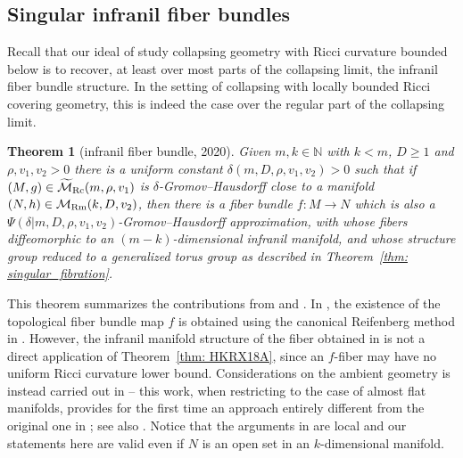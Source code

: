 \documentclass[10pt,a4paper]{amsart}
\numberwithin{equation}{section}
\newtheorem{Theorem}{Theorem}[section]
\begin{document}
\subsection{Singular infranil fiber bundles}\label{section3.1}
Recall that our ideal of study collapsing geometry with Ricci curvature bounded
below is to recover, at least over most parts of the collapsing limit, the
infranil fiber bundle structure. In the setting of collapsing with locally
bounded Ricci covering geometry, this is indeed the case over the regular part
of the collapsing limit.
\begin{Theorem}[infranil fiber bundle, 2020] \label{thm: HR20}
Given $m,k\in \mathbb{N}$ with $k<m$, $D\ge 1$ and $\rho,v_1,v_2>0$ there is a
uniform constant $\delta(m,D,\rho, v_1,v_2)>0$ such that if $(M,g)\in
\widetilde{\mathcal{M}}_{\rm Rc}(m,\rho,v_1)$ is $\delta$-Gromov--Hausdorff close to
a manifold $(N,h)\in \mathcal{M}_{\rm Rm}(k,D,v_2)$, then there is a fiber bundle
$f\colon M\to N$ which is also a $\Psi(\delta|m,D,\rho,v_1,v_2)$-Gromov--Hausdorff
approximation, with whose fibers diffeomorphic to an $(m-k)$-dimensional
infranil manifold, and whose structure group reduced to a generalized torus
group as described in Theorem~{\rm \ref{thm: singular_fibration}}.
\end{Theorem}
This theorem summarizes the contributions from \cite{Huang20} and \cite{Rong20}.
In \cite{Huang20}, the existence of the topological fiber bundle map $f$ is
obtained using the canonical Reifenberg method in \cite{CJN18}. However, the
infranil manifold structure of the fiber obtained in \cite{Rong20} is not a
direct application of Theorem~\ref{thm: HKRX18A}, since an $f$-fiber may have no
uniform Ricci curvature lower bound. Considerations on the ambient geometry is
instead carried out in \cite{Rong20} -- this work, when restricting to the
case of almost flat manifolds, provides for the first time an approach entirely
different from the original one in \cite{Gromov78b, Ruh82}; see also
\cite{Rong19}. Notice that the arguments in \cite{Huang20, Rong20} are local
and our statements here are valid even if $N$ is an open set in an
$k$-dimensional manifold.
\end{document}
